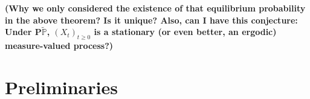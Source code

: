 \documentclass[12pt,a4paper]{amsart}
\numberwithin{equation}{section}
\theoremstyle{plain}
\theoremstyle{definition}
\begin{document}
{\bf (Why we only considered the existence of that equilibrium probability in the above theorem? Is it unique? Also, can I have this conjecture: Under $\mathbf P \widetilde{\mathbb P}$, $(X_t)_{t\geq 0}$ is a stationary (or even better, an ergodic) measure-valued process?)}
\begin{comment}
One important technique used to prove the above theorems is a ``spine-decomposition'' for the super-diffusion $X$ under a martingale change of measure.
This decomposition was used by Englander and Kyprianou in \cite{EnglanderKyprianou2004Local} to investigate the local extinction of super-diffusions, in which the branching mechanism is $\psi(x,z)-\beta(x)z=\alpha(x)^2z^2-\beta(x)z$.
This technique is usually used to investigate the properties of supercritical superdiffusions ($\lambda>0$).
Here we use it to analyze the subcritical case.
\end{comment}
\section{Preliminaries}
\end{document}
